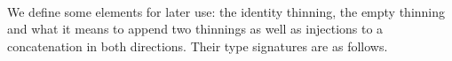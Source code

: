 \begin{code}%
\>[0]\AgdaSpace{}%
\AgdaSpace{}%
\AgdaSymbol{:}\AgdaSpace{}%
\AgdaSpace{}%
\AgdaSpace{}%
\AgdaSpace{}%
\AgdaSpace{}%
\AgdaSpace{}%
\<%
\\
\>[0][@{}l@{\AgdaIndent{0}}]%
\>[2]%
\>[6]\AgdaSymbol{:}\AgdaSpace{}%
\AgdaSpace{}%
\AgdaSpace{}%
\<%
\\
%
\>[2]%
\>[6]\AgdaSymbol{:}\AgdaSpace{}%
\AgdaSpace{}%
\AgdaSpace{}%
\AgdaSpace{}%
\AgdaSpace{}%
\AgdaSpace{}%
\AgdaSpace{}%
\AgdaSpace{}%
\<%
\\
%
\>[2]%
\>[6]\AgdaSymbol{:}\AgdaSpace{}%
\AgdaSpace{}%
\AgdaSpace{}%
\AgdaSpace{}%
\AgdaSpace{}%
\AgdaSpace{}%
\AgdaSpace{}%
\AgdaSpace{}%
\AgdaSpace{}%
\<%
\end{code}

We define some elements for later use: the identity thinning, the empty
thinning and what it means to append two thinnings as well as injections
to a concatenation in both directions. Their type signatures are as follows.

